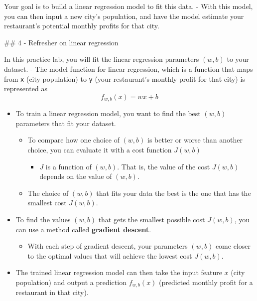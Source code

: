 \documentclass[11pt]{article}
\providecommand{\tightlist}{%
      \setlength{\itemsep}{0pt}\setlength{\parskip}{0pt}}
\begin{document}
    Your goal is to build a linear regression model to fit this data. - With
this model, you can then input a new city's population, and have the
model estimate your restaurant's potential monthly profits for that
city.

    \#\# 4 - Refresher on linear regression

In this practice lab, you will fit the linear regression parameters
\((w,b)\) to your dataset. - The model function for linear regression,
which is a function that maps from \texttt{x} (city population) to
\texttt{y} (your restaurant's monthly profit for that city) is
represented as \[f_{w,b}(x) = wx + b\]

\begin{itemize}
\item
  To train a linear regression model, you want to find the best
  \((w,b)\) parameters that fit your dataset.

  \begin{itemize}
  \tightlist
  \item
    To compare how one choice of \((w,b)\) is better or worse than
    another choice, you can evaluate it with a cost function \(J(w,b)\)

    \begin{itemize}
    \tightlist
    \item
      \(J\) is a function of \((w,b)\). That is, the value of the cost
      \(J(w,b)\) depends on the value of \((w,b)\).
    \end{itemize}
  \item
    The choice of \((w,b)\) that fits your data the best is the one that
    has the smallest cost \(J(w,b)\).
  \end{itemize}
\item
  To find the values \((w,b)\) that gets the smallest possible cost
  \(J(w,b)\), you can use a method called \textbf{gradient descent}.

  \begin{itemize}
  \tightlist
  \item
    With each step of gradient descent, your parameters \((w,b)\) come
    closer to the optimal values that will achieve the lowest cost
    \(J(w,b)\).
  \end{itemize}
\item
  The trained linear regression model can then take the input feature
  \(x\) (city population) and output a prediction \(f_{w,b}(x)\)
  (predicted monthly profit for a restaurant in that city).
\end{itemize}
\end{document}
